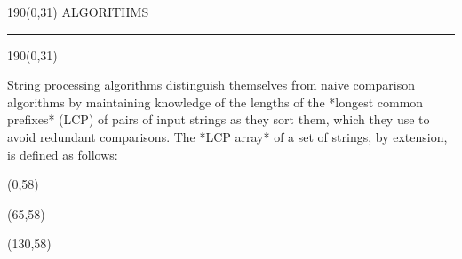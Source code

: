 \begin{textblock}{190}(0,31)
\sffamily\normalsize{\color{sciorange}ALGORITHMS}\small\\
\rule[3mm]{190mm}{0.1pt}
\end{textblock}
\begin{textblock}{190}(0,31)
\begin{multicols}{3}
\footnotesize
String processing algorithms distinguish themselves from naive comparison
algorithms by maintaining knowledge of the lengths of the *longest common
prefixes* (LCP) of pairs of input strings as they sort them, which they use to
avoid redundant comparisons.  The *LCP array* of a set of strings, by
extension, is defined as follows:
\end{multicols}
\end{textblock}
\begin{textblock}{60}(0,58)
    
\end{textblock}

\begin{textblock}{60}(65,58)
    
\end{textblock}

\begin{textblock}{60}(130,58)
    
\end{textblock}
